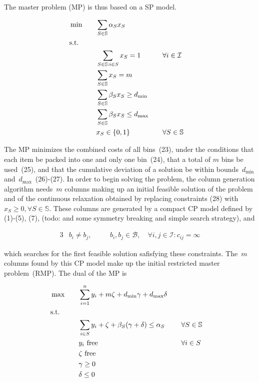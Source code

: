 \documentclass{llncs}
\begin{document}
The master problem (MP) is thus based on a SP model.

\begin{alignat}{3}
  & \min \quad && \sum \limits_{S \in \mathbb{S}} \alpha_{S} x_{S} \\
  &\textrm{s.t.} \notag \\
  &&& \sum \limits_{S \in \mathbb{S}:i \in S} x_{S} = 1 && \quad \forall i \in \mathcal{I} \\
  &&& \sum \limits_{S \in \mathbb{S}} x_{S} = m \\
  &&& \sum \limits_{S \in \mathbb{S}} \beta_{S} x_{S} \geq d_{\min} && \\
  &&& \sum \limits_{S \in \mathbb{S}} \beta_{S} x_{S} \leq d_{\max} && \\
  &&& x_{S} \in \{0, 1\} && \quad \forall S \in \mathbb{S}
\end{alignat}

The MP minimizes the combined costs of all bins~(23), under the conditions that each item be packed into one and only one bin~(24), that a total of $m$ bins be used~(25), and that the cumulative deviation of a solution be within bounds~$d_{\min}$ and~$d_{\max}$~(26)-(27). In order to begin solving the problem, the column generation algorithm needs~$m$ columns making up an initial feasible solution of the problem and of the continuous relaxation obtained by replacing constraints (28) with $x_{S} \geq 0, \forall S \in \mathbb{S}$. These columns are generated by a compact CP model defined by (1)-(5), (7), (todo: and some symmetry breaking and simple search strategy), and

\begin{alignat}{3}
  & b_{i} \neq b_{j}, \quad && b_{i}, b_{j} \in \mathcal{B}, \quad \forall i, j \in \mathcal{I}:c_{ij}=\infty
\end{alignat}

\noindent which searches for the first feasible solution safisfying these constraints. The~$m$ columns found by this CP model make up the initial restricted master problem~(RMP). The dual of the MP is

\begin{alignat}{3}
  & \max \quad && \sum \limits_{i=1}^{n} y_{i} + m\zeta + d_{\min}\gamma + d_{\max}\delta \\
  &\textrm{s.t.} \notag \\
  &&& \sum \limits_{i \in S} y_{i} + \zeta + \beta_{S}(\gamma + \delta) \leq \alpha_{S} && \quad \forall S \in \mathbb{S} \\
  &&& y_{i} \text{ free} && \quad \forall i \in S \\
  &&& \zeta \text{ free} \\
  &&& \gamma \geq 0 \\
  &&& \delta \leq 0
\end{alignat}
\end{document}

